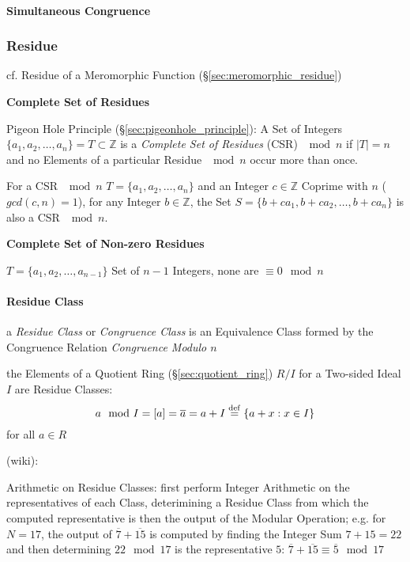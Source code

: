 \paragraph{Simultaneous Congruence}\label{sec:simultaneous_congruence}\hfill



\subsubsection{Residue}\label{sec:residue}

\fist cf. Residue of a Meromorphic Function (\S\ref{sec:meromorphic_residue})

\textbf{Complete Set of Residues}

Pigeon Hole Principle (\S\ref{sec:pigeonhole_principle}): A Set of Integers
$\{a_1, a_2, \ldots, a_n\} = T \subset \mathbb{Z}$ is a \emph{Complete Set of
  Residues} (CSR) $\mod n$ if $|T| = n$ and no Elements of a particular Residue
$\mod n$ occur more than once.

For a CSR $\mod n$ $T = \{a_1, a_2, \ldots, a_n\}$ and an Integer $c \in
\mathbb{Z}$ Coprime with $n$ ($gcd(c,n) = 1$), for any Integer $b \in
\mathbb{Z}$, the Set $S = \{b + ca_1, b + ca_2, \ldots, b + ca_n \}$ is also a
CSR $\mod n$.



\textbf{Complete Set of Non-zero Residues}

$T = \{ a_1, a_2, \ldots, a_{n-1} \}$ Set of $n-1$ Integers, none are
$\equiv 0 \mod n$



\paragraph{Residue Class}\label{sec:residue_class}\hfill

a \emph{Residue Class} or \emph{Congruence Class} is an Equivalence Class formed
by the Congruence Relation \emph{Congruence Modulo $n$}

\fist the Elements of a Quotient Ring (\S\ref{sec:quotient_ring}) $R / I$ for a
Two-sided Ideal $I$ are Residue Classes:
\[
  a \mod I = [a] = \overline{a} = a + I \stackrel{\mathrm{def}}= \{ a + x : x \in I \}
\]
for all $a \in R$

(wiki):

Arithmetic on Residue Classes: first perform Integer Arithmetic on the
representatives of each Class, deterimining a Residue Class from which the
computed representative is then the output of the Modular Operation; e.g. for
$N = 17$, the output of $\overline{7} + \overline{15}$ is computed by finding
the Integer Sum $7 + 15 = 22$ and then determining $22 \mod 17$ is the
representative $5$:
$\overline{7} + \overline{15} \equiv \overline{5} \mod 17$

